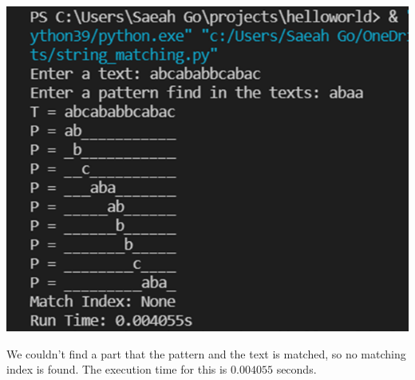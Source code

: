\documentclass{article}
\begin{document}
\begin{center}
\includegraphics[scale = 0.7]{inputsize13 worst.png} \\
\end{center}
We couldn't find a part that the pattern and the text is matched, so no matching index is found. The execution time for this is $0.004055$ seconds.
\end{document}
